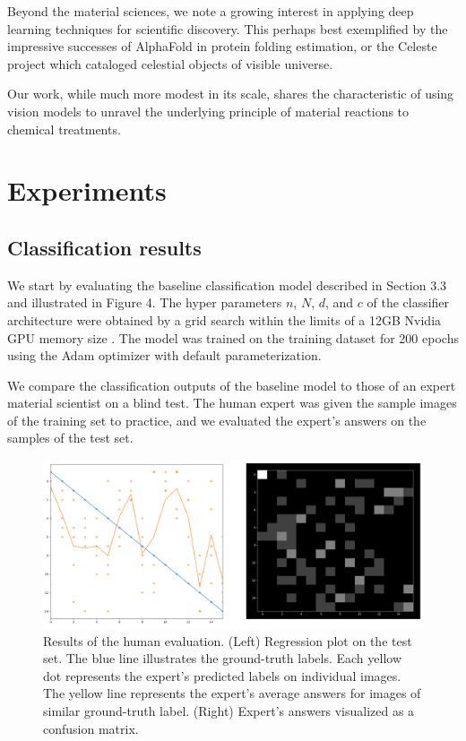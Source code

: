 \documentclass[10pt,twocolumn,letterpaper]{article}
\begin{document}
Beyond the material sciences, we note a growing interest in applying deep learning techniques
for scientific discovery. 
This perhaps best exemplified by the impressive successes of AlphaFold \cite{evans2018novo} in protein folding estimation,
or the Celeste \cite{regier2015celeste} project which cataloged celestial objects of visible universe.

Our work, while much more modest in its scale, 
shares the characteristic of using vision models to unravel
the underlying principle of material reactions to chemical treatments.

\section{Experiments}

\subsection{Classification results}
% 
We start by evaluating the baseline classification model described in Section 3.3 and illustrated in Figure 4.
The hyper parameters $n$, $N$, $d$, and $c$ of the classifier architecture 
were obtained by a grid search within the limits of a 12GB Nvidia GPU memory size .
The model was trained on the training dataset for 200 epochs using the Adam optimizer with default parameterization.

We compare the classification outputs of the baseline model to those 
of an expert material scientist on a blind test.
The human expert was given the sample images of the training set to practice,
and we evaluated the expert's answers on the samples of the test set.

\begin{figure}[h]
\centering
\includegraphics[width=0.9\linewidth]{"./figures/Figure7"}
\caption{
Results of the human evaluation. 
(Left) Regression plot on the test set. 
The blue line illustrates the ground-truth labels.
Each yellow dot represents the expert's predicted labels on individual images. 
The yellow line represents the expert's average answers for images of similar ground-truth label.
(Right) Expert's answers visualized as a confusion matrix.
}
\end{figure}
\end{document}
